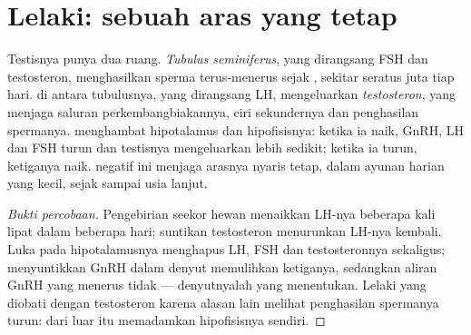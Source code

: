 \section{Lelaki: sebuah aras yang tetap}

\begin{proposition}\label{prop:g11:hormones-and-reproduction:male}
Testisnya punya dua ruang. \emph{Tubulus seminiferus}, yang dirangsang
FSH dan testosteron, menghasilkan sperma terus-menerus sejak
, sekitar seratus juta tiap hari.  di antara tubulusnya,
yang dirangsang LH, mengeluarkan \emph{testosteron}, yang menjaga
saluran perkembangbiakannya, ciri sekundernya dan penghasilan
spermanya.  menghambat hipotalamus dan hipofisisnya: ketika
ia naik, GnRH, LH dan FSH turun dan testisnya mengeluarkan lebih
sedikit; ketika ia turun, ketiganya naik.  negatif ini
menjaga arasnya nyaris tetap, dalam ayunan harian yang kecil, sejak
 sampai usia lanjut.
\end{proposition}
\begin{proof}[Bukti percobaan]
Pengebirian seekor hewan menaikkan LH-nya beberapa kali lipat dalam
beberapa hari; suntikan testosteron menurunkan LH-nya kembali. Luka
pada hipotalamusnya menghapus LH, FSH dan testosteronnya sekaligus;
menyuntikkan GnRH dalam denyut memulihkan ketiganya, sedangkan aliran
GnRH yang menerus tidak --- denyutnyalah yang menentukan. Lelaki yang
diobati dengan testosteron karena alasan lain melihat penghasilan
spermanya turun:  dari luar itu memadamkan hipofisisnya sendiri.
\end{proof}

